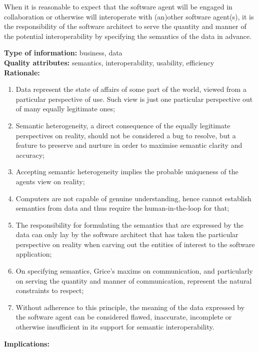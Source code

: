 \documentclass[sort&compress,preprint,authoryear,3p,twocolumn]{elsarticle}
\begin{document}
\begin{mmdp}\label{dp:rfsm}

When it is reasonable to expect that the software agent will be engaged in collaboration or otherwise will interoperate with (an)other software agent(s), it is the responsibility of the software architect to serve the quantity and manner of the potential interoperability by specifying the semantics of the data in advance. 

\textbf{Type of information:} business, data  \\
\textbf{Quality attributes:} semantics, interoperability, usability, efficiency   \\
\textbf{Rationale:}
\begin{enumerate}
  \item Data represent the state of affairs of some part of the world, viewed from a particular perspective of use. Such view is just one particular perspective out of many equally legitimate ones;
  \item Semantic heterogeneity, a direct consequence of the equally legitimate perspectives on reality, should not be considered a bug to resolve, but a feature to preserve and nurture in order to maximise semantic clarity and accuracy;
  \item Accepting semantic heterogeneity implies the probable uniqueness of the agents view on reality;
  \item Computers are not capable of genuine understanding, hence cannot establish semantics from data and thus require the human-in-the-loop for that;
  \item The responsibility for formulating the semantics that are expressed by the data can only lay by the software architect that has taken the particular perspective on reality when carving out the entities of interest to the software application;
  \item On specifying semantics, Grice’s maxims on communication, and particularly on serving the quantity and manner of communication, represent the natural constraints to respect;
  \item Without adherence to this principle, the meaning of the data expressed by the software agent can be considered flawed, inaccurate, incomplete or otherwise insufficient in its support for semantic interoperability.
\end{enumerate}
\textbf{Implications:}
\begin{enumerate}

\end{enumerate}
\end{mmdp}
\end{document}
